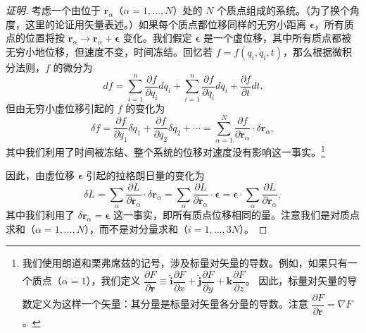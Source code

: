 \begin{proof}[证明]
考虑一个由位于 $\mathbf{r}_\alpha$（$\alpha = 1, \ldots, N$）处的 $N$ 个质点组成的系统。（为了换个角度，这里的论证用矢量表述。）如果每个质点都位移同样的无穷小距离 $\bm{\epsilon}$，所有质点的位置将按 $\mathbf{r}_\alpha \to \mathbf{r}_\alpha + \bm{\epsilon}$ 变化。我们假定 $\bm{\epsilon}$ 是一个虚位移，其中所有质点都被无穷小地位移，但速度不变，时间冻结。回忆若 $f = f(q_i, \dot{q}_i, t)$，那么根据微积分法则，$f$ 的微分为
\begin{equation}\label{eq:1.df}
df = \sum_{i=1}^{n}\frac{\partial f}{\partial q_i}dq_i + \sum_{i=1}^{n}\frac{\partial f}{\partial \dot{q}_i}d\dot{q}_i + \frac{\partial f}{\partial t}dt.
\end{equation}
但由无穷小虚位移引起的 $f$ 的变化为
\begin{equation}\label{eq:1.df2}
\delta f = \frac{\partial f}{\partial q_1}\delta q_1 + \frac{\partial f}{\partial q_2}\delta q_2 + \cdots = \sum_{\alpha=1}^{N}\frac{\partial f}{\partial \mathbf{r}_\alpha}\cdot\delta\mathbf{r}_\alpha,
\end{equation}
其中我们利用了时间被冻结、整个系统的位移对速度没有影响这一事实。\footnote{我们使用朗道和栗弗席兹的记号，涉及标量对矢量的导数。例如，如果只有一个质点（$\alpha = 1$），我们定义
$\dfrac{\partial F}{\partial \mathbf{r}} \equiv \hat{\mathbf{i}}\dfrac{\partial F}{\partial x} + \hat{\mathbf{j}}\dfrac{\partial F}{\partial y} + \hat{\mathbf{k}}\dfrac{\partial F}{\partial z}$。
因此，标量对矢量的导数定义为这样一个矢量：其分量是标量对矢量各分量的导数。注意 $\dfrac{\partial F}{\partial \mathbf{r}} = \nabla F$。}

因此，由虚位移 $\bm{\epsilon}$ 引起的拉格朗日量的变化为
\begin{equation}\label{eq:1.dL}
\delta L = \sum_{\alpha}\frac{\partial L}{\partial \mathbf{r}_\alpha}\cdot\delta\mathbf{r}_\alpha = \sum_{\alpha}\frac{\partial L}{\partial \mathbf{r}_\alpha}\cdot\bm{\epsilon} = \bm{\epsilon}\cdot\sum_{\alpha}\frac{\partial L}{\partial \mathbf{r}_\alpha},
\end{equation}
其中我们利用了 $\delta\mathbf{r}_\alpha = \bm{\epsilon}$ 这一事实，即所有质点位移相同的量。注意我们是对质点求和（$\alpha = 1, \ldots, N$），而不是对分量求和（$i = 1, \ldots, 3N$）。


\end{proof}
